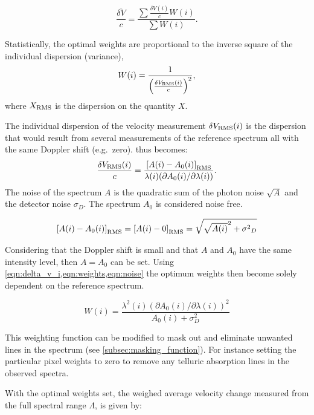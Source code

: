 \begin{equation}
\overline{\frac{\delta V}{c}} = \frac{\sum{\frac{\delta V(i)}{c}W(i)}}{\sum {W(i)}}.
\end{equation}

Statistically, the optimal weights are proportional to the inverse square of the individual dispersion (variance),
\begin{equation}
W(i) = \frac{1}{{\left(\frac{\delta V_{\textrm{RMS}}(i)}{c}\right)}^{2}}, \label{eqn:weights}
\end{equation}
where \(X_{\textrm{RMS}}\) is the dispersion on the quantity \(X\).

The individual dispersion of the velocity measurement \(\delta V_{\textrm{RMS}}(i)\) is the dispersion that would result from several measurements of the reference spectrum all with the same Doppler shift (e.g.\ zero).
 thus becomes:
\begin{equation}
    \frac{\delta V_{\textrm{RMS}}(i)}{c} = \frac{{[A(i) - {A}_{0}(i)]}_{\textrm{RMS}} }{\lambda(i) (\partial {A}_{0}(i)/\partial \lambda(i))}.
    \label{eqn:delta_v_i_rms}
\end{equation}
The noise of the spectrum \(A\) is the quadratic sum of the photon noise \(\sqrt{A}\) and the detector noise \({\sigma}_{D}\).
The spectrum \({A}_{0}\) is considered noise free.

\begin{equation}
{[{A(i)-{A}_{0}(i)}]}_{\textrm{RMS}} = {[{A(i)} - 0]}_{\textrm{RMS}} = \sqrt{{\sqrt{A(i)}}^{2} + {{\sigma}^{2}}_{D}} \label{eqn:noise}
\end{equation}

Considering that the Doppler shift is small and that \(A\) and \({A}_{0}\) have the same intensity level, then \(A = {A}_{0}\) can be set.
Using \cref{eqn:delta_v_i,eqn:weights,eqn:noise} the optimum weights then become solely dependent on the reference spectrum.

\begin{equation}
W(i) = \frac{{\lambda}^{2}(i) {({\partial {A}_{0}(i)}/{\partial \lambda(i)})}^{2}}{A_0(i) + {\sigma}^{2}_{D}} \label{eqn:optimal_weight}
\end{equation}

This weighting function can be modified to mask out and eliminate unwanted lines in the spectrum (see \cref{subsec:masking_function}).
For instance setting the particular pixel weights to zero to remove any telluric absorption lines in the observed spectra. 

With the optimal weights set, the weighed average velocity change measured from the full spectral range \(\Lambda\), is given by:

